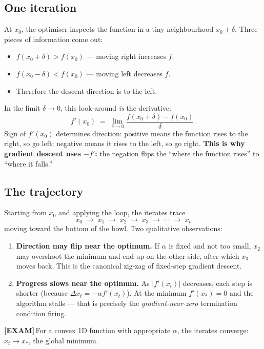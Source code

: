 \documentclass[11pt, a4paper]{article}
\newcommand{\examflag}{\textcolor{tipBd}{\textbf{[EXAM]}}\,}
\begin{document}
\subsection{One iteration}

At $x_0$, the optimiser inspects the function in a tiny neighbourhood $x_0 \pm \delta$. Three pieces of information come out:

\begin{itemize}
  \item $f(x_0 + \delta) > f(x_0)$ — moving right increases $f$.
  \item $f(x_0 - \delta) < f(x_0)$ — moving left decreases $f$.
  \item Therefore the descent direction is to the left.
\end{itemize}

In the limit $\delta \to 0$, this look-around \emph{is} the derivative:
\[
f'(x_0) \;=\; \lim_{\delta \to 0} \frac{f(x_0 + \delta) - f(x_0)}{\delta}.
\]
Sign of $f'(x_0)$ determines direction: positive means the function rises to the right, so go left; negative means it rises to the left, so go right. \textbf{This is why gradient descent uses $-f'$:} the negation flips the ``where the function rises'' to ``where it falls.''

\subsection{The trajectory}

Starting from $x_0$ and applying the loop, the iterates trace
\[
x_0 \;\to\; x_1 \;\to\; x_2 \;\to\; x_3 \;\to\; \cdots \;\to\; x_t
\]
moving toward the bottom of the bowl. Two qualitative observations:

\begin{enumerate}
  \item \textbf{Direction may flip near the optimum.} If $\alpha$ is fixed and not too small, $x_2$ may overshoot the minimum and end up on the other side, after which $x_3$ moves back. This is the canonical zig-zag of fixed-step gradient descent.
  \item \textbf{Progress slows near the optimum.} As $|f'(x_t)|$ decreases, each step is shorter (because $\Delta x_t = -\alpha f'(x_t)$). At the minimum $f'(x_*) = 0$ and the algorithm stalls — that is precisely the \emph{gradient-near-zero} termination condition firing.
\end{enumerate}

\examflag{}For a convex 1D function with appropriate $\alpha$, the iterates converge: $x_t \to x_*$, the global minimum.
\end{document}
